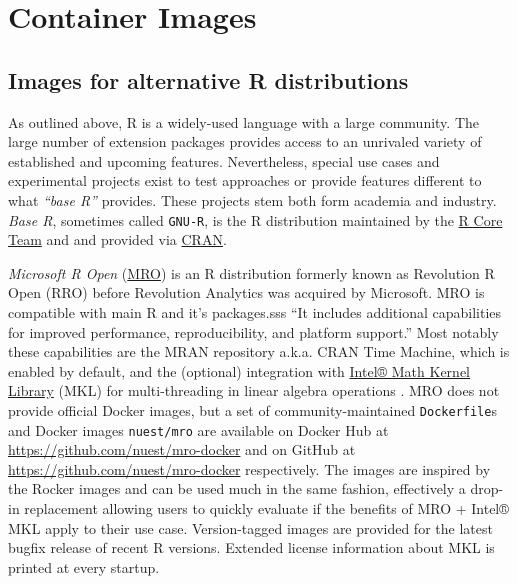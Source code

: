 \hypertarget{container-images}{%
\section{Container Images}\label{container-images}}

\hypertarget{images-for-alternative-r-distributions}{%
\subsection{Images for alternative R
distributions}\label{images-for-alternative-r-distributions}}

As outlined above, R is a widely-used language with a large community.
The large number of extension packages provides access to an unrivaled
variety of established and upcoming features. Nevertheless, special use
cases and experimental projects exist to test approaches or provide
features different to what \emph{``base R''} provides. These projects
stem both form academia and industry. \emph{Base R}, sometimes called
\texttt{GNU-R}, is the R distribution maintained by the
\href{https://www.r-project.org/contributors.html}{R Core Team} and and
provided via \href{https://cran.r-project.org/}{CRAN}.

\emph{Microsoft R Open}
(\href{https://github.com/nuest/mro-docker}{MRO}) is an R distribution
formerly known as Revolution R Open (RRO) before Revolution Analytics
was acquired by Microsoft. MRO is compatible with main R and it's
packages.sss ``It includes additional capabilities for improved
performance, reproducibility, and platform support.''
\citep{microsoft_mro} Most notably these capabilities are the MRAN
repository a.k.a. CRAN Time Machine, which is enabled by default, and
the (optional) integration with
\href{https://software.intel.com/en-us/mkl}{Intel® Math Kernel Library}
(MKL) for multi-threading in linear algebra operations
\citep{microsoft_multithread}. MRO does not provide official Docker
images, but a set of community-maintained \texttt{Dockerfile}s and
Docker images \texttt{nuest/mro} are available on Docker Hub at
\url{https://github.com/nuest/mro-docker} and on GitHub at
\url{https://github.com/nuest/mro-docker} respectively. The images are
inspired by the Rocker images and can be used much in the same fashion,
effectively a drop-in replacement allowing users to quickly evaluate if
the benefits of MRO + Intel® MKL apply to their use case. Version-tagged
images are provided for the latest bugfix release of recent R versions.
Extended license information about MKL is printed at every startup.

